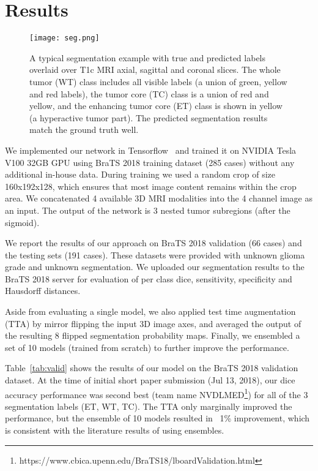 \documentclass[runningheads]{llncs}
\newcommand{\0}{\ensuremath{\mathbf{0}}}
\newcommand{\1}{\ensuremath{\mathbf{1}}}
\begin{document}
 \section{Results}
 \label{sec:results}
 
   \begin{figure}[t] 
 	\centering
 	\texttt{[image: seg.png]}
 	\caption{A typical segmentation example with true and predicted labels overlaid over T1c MRI axial, sagittal and coronal slices.  The whole tumor (WT) class includes all visible labels (a union of green, yellow and red labels), the tumor core (TC) class is a union of red and yellow, and the enhancing tumor core (ET) class is shown in yellow (a hyperactive tumor part). The predicted segmentation results match the ground truth well.}
 	\label{fig:seg}
 	\vspace{-5mm}
 \end{figure}
 
 We implemented our network in Tensorflow~\cite{tensorflow2015} and trained it on NVIDIA Tesla V100 32GB GPU using BraTS 2018 training dataset (285 cases) without any additional in-house data. During training we used a random crop of size 160x192x128, which ensures that most image content remains within the crop area. We concatenated  4 available 3D MRI modalities into the 4 channel image as an input. The output of the network is 3 nested tumor subregions (after the sigmoid).
 
 We report the results of our approach  on BraTS 2018 validation (66 cases) and the testing sets (191 cases). These datasets were provided with unknown glioma grade and unknown segmentation. We uploaded our segmentation results to the BraTS 2018 server for evaluation of per class dice, sensitivity, specificity and Hausdorff distances. 
 
  Aside from evaluating a single model,  we also applied test time augmentation (TTA) by mirror flipping the input 3D image axes, and averaged the output of the resulting 8 flipped segmentation probability maps. Finally, we ensembled a set of 10 models (trained from scratch) to further improve the performance.

 
 Table~\ref{tab:valid} shows the results of our model on the BraTS 2018 validation dataset. At the time of initial short paper submission (Jul 13, 2018), our dice accuracy performance was second best (team name  NVDLMED\footnote{https://www.cbica.upenn.edu/BraTS18/lboardValidation.html}) for all of the 3 segmentation labels  (ET, WT, TC). 
 The TTA only marginally improved the performance, but the ensemble of 10 models resulted in ~1\% improvement, which is consistent with the literature results of using ensembles. 
 
\end{document}
